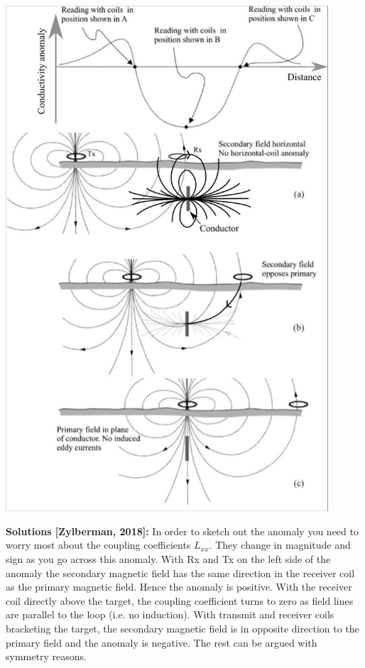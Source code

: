     \begin{tcolorbox}[enhanced jigsaw,breakable,pad at break*=1mm,
    colback=blue!5!white,colframe=babyblueeyes,title=Solutions,
    watermark color=white]
    \begin{center}
        \includegraphics[width=12cm]{Includes/EMI/SlingrammAnomaly.jpg}
      \end{center}    
    \textbf{Solutions [Zylberman, 2018]:} In order to sketch out the anomaly you need to worry most about the coupling coefficients $L_{xx}$. They change in magnitude and sign as you go across this anomaly. With Rx and Tx on the left side of the anomaly the secondary magnetic field has the same direction in the receiver coil as the primary magnetic field. Hence the anomaly is positive. With the receiver coil directly above the target, the coupling coefficient turns to zero as field lines are parallel to the loop (i.e. no induction). With transmit and receiver coils bracketing the target, the secondary magnetic field is in opposite direction to the primary field and the anomaly is negative. The rest can be argued with symmetry reasons.
\end{tcolorbox}
\fi